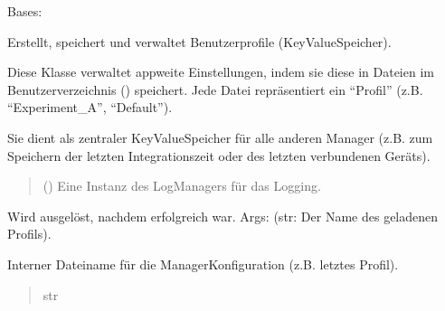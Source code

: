\documentclass[letterpaper,10pt,english]{sphinxmanual}
\begin{document}
\begin{fulllineitems}
\label{\detokenize{modulab/profile_manager:modules.profile.ProfileManager.ProfileManager}}
\pysigstartsignatures
\pysiglinewithargsret
{}
{}
{}
\pysigstopsignatures
\sphinxAtStartPar
Bases: 

\sphinxAtStartPar
Erstellt, speichert und verwaltet Benutzerprofile (Key\sphinxhyphen{}Value\sphinxhyphen{}Speicher).

\sphinxAtStartPar
Diese Klasse verwaltet app\sphinxhyphen{}weite Einstellungen, indem sie diese in
\sphinxhyphen{}Dateien im Benutzerverzeichnis () speichert.
Jede \sphinxhyphen{}Datei repräsentiert ein “Profil” (z.B. “Experiment\_A”, “Default”).

\sphinxAtStartPar
Sie dient als zentraler Key\sphinxhyphen{}Value\sphinxhyphen{}Speicher für alle anderen Manager
(z.B. zum Speichern der letzten Integrationszeit oder des letzten
verbundenen Geräts).
\begin{quote}\begin{description}
\sphinxAtStartPar
{} () \textendash{} Eine Instanz des LogManagers für das Logging.

\end{description}\end{quote}
\begin{description}
\begin{description}
\sphinxAtStartPar
Wird ausgelöst, nachdem  erfolgreich war.
Args: (str: Der Name des geladenen Profils).

\end{description}

\end{description}

\begin{fulllineitems}
\label{\detokenize{modulab/profile_manager:modules.profile.ProfileManager.ProfileManager.CONFIG_FILE_NAME}}
\pysigstartsignatures
\pysigline
{}
\pysigstopsignatures
\sphinxAtStartPar
Interner Dateiname für die Manager\sphinxhyphen{}Konfiguration (z.B. letztes Profil).
\begin{quote}\begin{description}
\sphinxAtStartPar
str


\end{description}
\end{quote}
\end{fulllineitems}
\end{fulllineitems}
\end{document}
